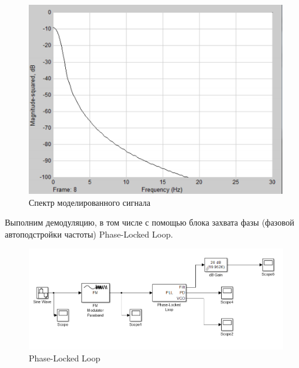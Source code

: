 \begin{figure}[H]

\includegraphics[width=150mm, scale = 0.9]{lab8/8_10}
   \caption{Спектр моделированного сигнала}

\end{figure}
Выполним демодуляцию, в том числе с помощью блока захвата фазы (фазовой автоподстройки частоты) Phase-Locked Loop.



\begin{figure}[H]
\includegraphics[width=150mm, scale = 0.9]{lab8/PLL}
   \caption{Phase-Locked Loop}
\end{figure}

